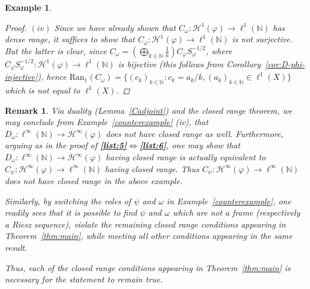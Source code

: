 \documentclass{amsart}
\newtheorem{example}[theorem]{Example}
\newtheorem{rem.}[theorem]{Remark}
\def\Hil{\mathcal{H}}
\begin{document}
\begin{example}
\begin{proof}
$(iv)$ Since we have already shown that $C_{\omega}:\Hil^1(\varphi)\to \ell^1(\mathbb{N})$ has dense range, it suffices to show that $C_{\omega}:\Hil^1(\varphi)\to \ell^1(\mathbb{N})$ is not surjective. But the latter is clear, since $C_{\omega} = \left( \bigoplus_{k\in \mathbb{N}}\frac{1}{k}\right) C_{\varphi} S_{\varphi}^{-1/2}$, where $C_{\varphi} S_{\varphi}^{-1/2}:\Hil^1(\varphi) \to \ell^1(\mathbb{N})$ is bijective (this follows from Corollary~\ref{cor:D-phi-injective}), hence $\text{Ran}_1(C_\omega) = \lbrace (c_k)_{k\in \mathbb{N}}: c_k = a_k/k, (a_k)_{k\in \mathbb{N}} \in \ell^1(X)\rbrace $ which is not equal to $\ell^1(X)$.
\end{proof}
\end{example}

\begin{rem.}\label{counterexample2}
Via duality (Lemma~\ref{Cadjoint}) and the closed range theorem, we may conclude from Example~\ref{counterexample} (iv), that $D_{\omega}:\ell^{\infty}(\mathbb{N})\to \Hil^{\infty}(\varphi)$ does not have closed range as well. Furthermore, arguing as in the proof of \textbf{\ref{list:5}$\Leftrightarrow$\ref{list:6}}, one may show that $D_{\omega}:\ell^{\infty}(\mathbb{N})\to \Hil^{\infty}(\varphi)$ having closed range is actually equivalent to $C_{\psi}: \Hil^{\infty}(\varphi) \to \ell^{\infty}(\mathbb{N})$ having closed range. Thus $C_{\psi}: \Hil^{\infty}(\varphi) \to \ell^{\infty}(\mathbb{N})$ does not have closed range in the above example. 

Similarly, by switching the roles of $\psi$ and $\omega$ in Example~\ref{counterexample}, one readily sees that it is possible to find $\psi$ and $\omega$ which are not a frame (respectively a Riesz sequence), violate the remaining closed range conditions appearing in Theorem~\ref{thm:main}, while meeting all other conditions appearing in the same result. 

Thus, each of the closed range conditions appearing in Theorem~\ref{thm:main} is necessary for the statement to remain true.
\end{rem.}
\end{document}
